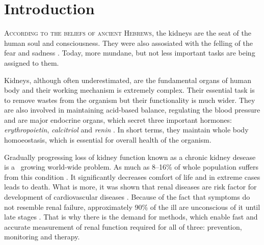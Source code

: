 
	\setcounter{page}{1}
	
	
\chapter{Introduction}



\lettrine[lines=3, slope=1em, findent=-0.8em]{A}{ccording to the beliefs of ancient Hebrews}, the kidneys are the seat of the human soul and consciousness. They were also assosiated with the felling of the fear and sadness \cite {maio1999metaphorical}. Today, more mundane, but not less important tasks are being assigned to them. 

Kidneys, although often underestimated, are the fundamental organs of human body and their working mechanism is extremely complex. Their essential task is to remove wastes from the organism but their functionality is much wider. They are also involved in maintaining acid-based balance, regulating the blood pressure and are major endocrine organs, which secret three important hormones: \textit{erythropoietin}, \textit{calcitriol} and \textit{renin} \cite{saladin}. In short terms, they maintain whole body homoeostasis, which is essential for overall health of the organism. 

Gradually progressing loss of kidney function known as a chronic kidney desease is a~ growing world-wide problem. As much as 8--16\% of whole population suffers from this condition \cite{statistics}. It significantly decreases comfort of life and in extreme cases leads to death. What is more, it was shown that renal diseases are risk factor for development of cardiovascular diseases \cite{cardiovascular_diseases}.
Because of the fact that symptoms do not resemble renal failure, approximately 90\% of the ill are unconscious of it until late stages \cite{national_kidney_foundation}. That is why there is the demand for methods, which enable fast and accurate measurement of renal function required for all of three: prevention, monitoring and therapy.

